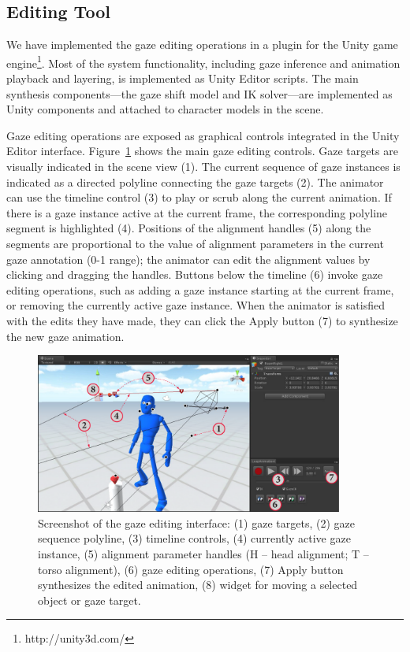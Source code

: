 \subsection{Editing Tool}

We have implemented the gaze editing operations in a plugin for the Unity game engine\footnote{http://unity3d.com/}. Most of the system functionality, including gaze inference and animation playback and layering, is implemented as Unity Editor scripts. The main synthesis components---the gaze shift model and IK solver---are implemented as Unity components and attached to character models in the scene.

Gaze editing operations are exposed as graphical controls integrated in the Unity Editor interface. Figure~\ref{fig:GazeEditingTool} shows the main gaze editing controls. Gaze targets are visually indicated in the scene view (1). The current sequence of gaze instances is indicated as a directed polyline connecting the gaze targets (2).  The animator can use the timeline control (3) to play or scrub along the current animation. If there is a gaze instance active at the current frame, the corresponding polyline segment is highlighted (4). Positions of the alignment handles (5) along the segments are proportional to the value of alignment parameters in the current gaze annotation (0-1 range); the animator can edit the alignment values by clicking and dragging the handles. Buttons below the timeline (6) invoke gaze editing operations, such as adding a gaze instance starting at the current frame, or removing the currently active gaze instance. When the animator is satisfied with the edits they have made, they can click the Apply button (7) to synthesize the new gaze animation.

\begin{figure}
\centering
\includegraphics[width=0.9\textwidth]{gazeauthoring/Figures/GazeEditingTool.pdf}
\caption{Screenshot of the gaze editing interface: (1) gaze targets, (2) gaze sequence polyline, (3) timeline controls, (4) currently active gaze instance, (5) alignment parameter handles (H -- head alignment; T -- torso alignment), (6) gaze editing operations, (7) Apply button synthesizes the edited animation, (8) widget for moving a selected object or gaze target.}
\label{fig:GazeEditingTool}
\end{figure}

